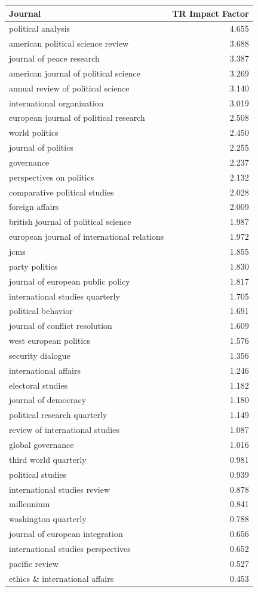 \documentclass[]{article}
\begin{document}
\begin{longtable}[c]{@{}lr@{}}
\toprule
Journal & TR Impact Factor\tabularnewline
\midrule
\endhead
political analysis & 4.655\tabularnewline
american political science review & 3.688\tabularnewline
journal of peace research & 3.387\tabularnewline
american journal of political science & 3.269\tabularnewline
annual review of political science & 3.140\tabularnewline
international organization & 3.019\tabularnewline
european journal of political research & 2.508\tabularnewline
world politics & 2.450\tabularnewline
journal of politics & 2.255\tabularnewline
governance & 2.237\tabularnewline
perspectives on politics & 2.132\tabularnewline
comparative political studies & 2.028\tabularnewline
foreign affairs & 2.009\tabularnewline
british journal of political science & 1.987\tabularnewline
european journal of international relations & 1.972\tabularnewline
jcms & 1.855\tabularnewline
party politics & 1.830\tabularnewline
journal of european public policy & 1.817\tabularnewline
international studies quarterly & 1.705\tabularnewline
political behavior & 1.691\tabularnewline
journal of conflict resolution & 1.609\tabularnewline
west european politics & 1.576\tabularnewline
security dialogue & 1.356\tabularnewline
international affairs & 1.246\tabularnewline
electoral studies & 1.182\tabularnewline
journal of democracy & 1.180\tabularnewline
political research quarterly & 1.149\tabularnewline
review of international studies & 1.087\tabularnewline
global governance & 1.016\tabularnewline
third world quarterly & 0.981\tabularnewline
political studies & 0.939\tabularnewline
international studies review & 0.878\tabularnewline
millennium & 0.841\tabularnewline
washington quarterly & 0.788\tabularnewline
journal of european integration & 0.656\tabularnewline
international studies perspectives & 0.652\tabularnewline
pacific review & 0.527\tabularnewline
ethics \& international affairs & 0.453\tabularnewline
\bottomrule
\end{longtable}
\end{document}
